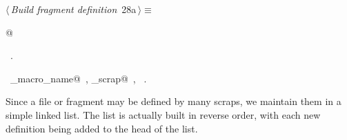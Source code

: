 \documentclass[a4paper]{report}
\begin{document}
\begin{flushleft} \small
\begin{minipage}{\linewidth}\label{scrap45}\raggedright\small
{} $\langle\,${\it Build fragment definition}\nobreak\ {\footnotesize {28a}}$\,\rangle\equiv$
\vspace{-1ex}
\begin{list}{}{} \item
\mbox{}@{\NWsep}
\end{list}
\vspace{-1.5ex}
\footnotesize
\begin{list}{}{\setlength{\itemsep}{-\parsep}\setlength{\itemindent}{-\leftmargin}}
\item \NWtxtMacroRefIn\ .
\item \NWtxtIdentsUsed\nobreak\  \verb@collect_macro_name@\nobreak\ , \verb@collect_scrap@\nobreak\ , \verb@Name@\nobreak\ .
\item{}
\end{list}
\end{minipage}\vspace{4ex}
\end{flushleft}
Since a file or fragment may be defined by many scraps, we maintain them
in a simple linked list. The list is actually built in reverse order,
with each new definition being added to the head of the list.
\end{document}
